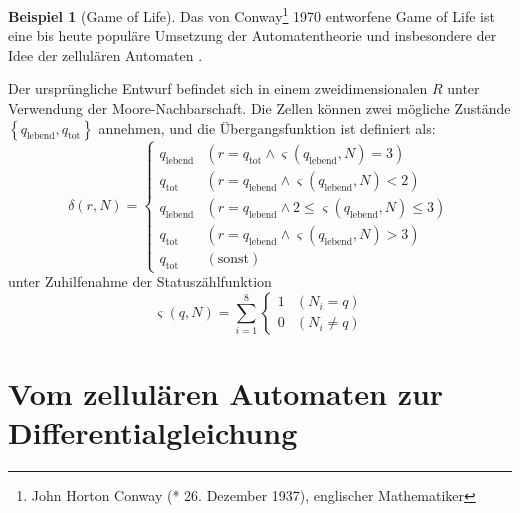 \documentclass[11pt]{article} %
\theoremstyle{definition}
\newtheorem*{beisp}{Beispiel}
\begin{document}
\begin{beisp}[Game of Life]

\newcommand{\ql}{q_\textrm{lebend}}
\newcommand{\qt}{q_\textrm{tot}}

Das von Conway\footnote{John Horton Conway (* 26. Dezember 1937), englischer Mathematiker\cite{wiki:conway}} 1970 entworfene Game of Life ist eine bis heute populäre Umsetzung der Automatentheorie und insbesondere der Idee der zellulären Automaten \cite{wiki:gameoflife}.

Der ursprüngliche Entwurf befindet sich in einem zweidimensionalen $R$ unter Verwendung der Moore-Nachbarschaft. Die Zellen können zwei mögliche Zustände $\left\{\ql, \qt \right\}$ annehmen, und die Übergangsfunktion ist definiert \cite{Hafner} als:
\begin{equation*}
\delta(r, N) = \begin{cases}
\ql & (r = \qt \land \varsigma(\ql,N) = 3) \\
\qt & (r = \ql \land \varsigma(\ql, N) < 2) \\
\ql & (r = \ql \land 2 \leq \varsigma(\ql, N) \leq 3) \\
\qt & (r = \ql \land  \varsigma(\ql, N) > 3) \\
\qt & (\textrm{sonst})
\end{cases}
\end{equation*}
unter Zuhilfenahme der Statuszählfunktion
\begin{equation*}
\varsigma(q, N) = \sum\limits_{i=1}^8  \begin{cases} 1 & (N_i = q) \\ 0 & (N_i \neq q) \end{cases}
\end{equation*}

\end{beisp}

\section{Vom zellulären Automaten zur Differentialgleichung}
\end{document}
